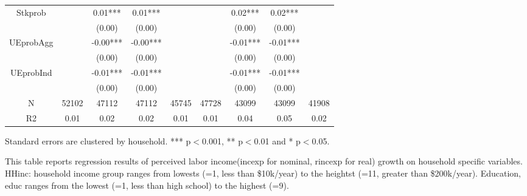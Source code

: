 \documentclass[12pt,notitlepage,onecolumn,aps,pra]{article}
\begin{document}
\begin{table}[p]
\begin{adjustbox}{width={\textwidth}}
\begin{threeparttable}
\begin{tabular}{ccccccccc}
Stkprob          &           &   0.01*** &    0.01*** &             &           &    0.02*** &     0.02*** &              \\
                 &           &    (0.00) &     (0.00) &             &           &     (0.00) &      (0.00) &              \\
UEprobAgg        &           &  -0.00*** &   -0.00*** &             &           &   -0.01*** &    -0.01*** &              \\
                 &           &    (0.00) &     (0.00) &             &           &     (0.00) &      (0.00) &              \\
UEprobInd        &           &  -0.01*** &   -0.01*** &             &           &   -0.01*** &    -0.01*** &              \\
                 &           &    (0.00) &     (0.00) &             &           &     (0.00) &      (0.00) &              \\
N                &     52102 &     47112 &      47112 &       45745 &     47728 &      43099 &       43099 &        41908 \\
R2               &      0.01 &      0.02 &       0.02 &        0.01 &      0.01 &       0.04 &        0.05 &         0.02 \\
\bottomrule
\end{tabular}
\begin{tablenotes}\item Standard errors are clustered by household. *** p$<$0.001, ** p$<$0.01 and * p$<$0.05. 
\item This table reports regression results of perceived labor income(incexp for nominal, rincexp for real) growth on household specific variables. HHinc: household income group ranges from lowests (=1, less than \$10k/year) to the heightst (=11, greater than \$200k/year). Education, educ ranges from the lowest (=1, less than high school) to the highest (=9).
\end{tablenotes}
\end{threeparttable}
\end{adjustbox}
\end{table}
\end{document}

